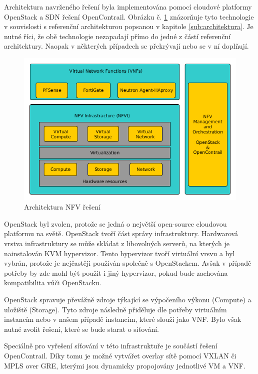 Architektura navrženého řešení byla implementována pomocí cloudové platformy OpenStack a SDN řešení OpenContrail. Obrázku č. \ref{fig:VNF_overview} znázorňuje tyto technologie v souvislosti s referenční architekturou popsanou v kapitole \ref{sub:architektura}. Je nutné říci, že obě technologie nezapadají přímo do jedné z částí referenční architektury. Naopak v některých případech se překrývají nebo se v ní doplňují.

\begin{figure}[h]
\begin{centering}
\includegraphics[scale=0.51]{images/VNF_overview}
\par\end{centering}
\caption{Architektura NFV řešení\label{fig:VNF_overview}}
\end{figure}

OpenStack byl zvolen, protože se jedná o největší open-source cloudovou platformu na světě. OpenStack tvoří část správy infrastruktury. Hardwarová vrstva infrastruktury se může skládat z libovolných serverů, na kterých je nainstalován KVM hypervizor. Tento hypervizor tvoří virtuální vrsvu a byl vybrán, protože je nejčastěji používán společně s OpenStackem. Avšak v případě potřeby by zde mohl být použit i jiný hypervizor, pokud bude zachována kompatibilita vůči OpenStacku.

OpenStack spravuje převážně zdroje týkající se výpočeního výkonu (Compute) a uložiště (Storage). Tyto zdroje následně přiděluje dle potřeby virtuálním instancím nebo v našem případě instancím, které slouží jako VNF. Bylo však nutné zvolit řešení, které se bude starat o síťování.

Speciálně pro vyřešení síťování v této infrastruktuře je součástí řešení OpenContrail. Díky tomu je možné vytvářet overlay sítě pomocí VXLAN či MPLS over GRE, kterými jsou dynamicky propojovány jednotlivé VM a VNF. 

